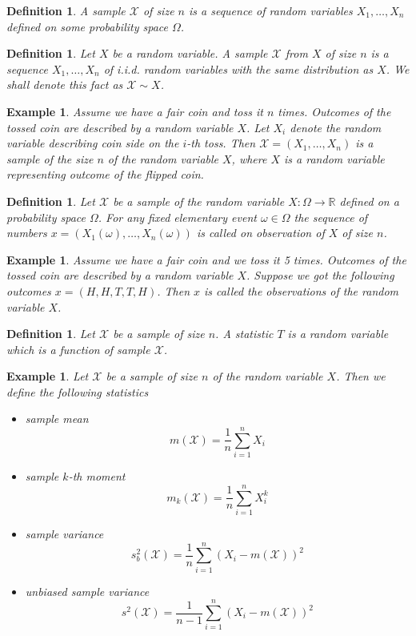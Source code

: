 \documentclass[12pt]{article}
\newtheorem{definition}[theorem]{Definition}
\newtheorem{example}[theorem]{Example}
\begin{document}
\begin{definition} A sample $\mathscr{X}$ of size $n$ is a sequence of random variables $X_1,\ldots,X_n$ defined on some probability space $\Omega$.
\end{definition}

\begin{definition} Let $X$ be a random variable. A sample $\mathscr{X}$ from $X$ of size $n$ is a sequence $X_1,\ldots,X_n$ of i.i.d. random variables with the same distribution as $X$. We shall denote this fact as $\mathscr{X}\sim X$. 
\end{definition}

\begin{example} Assume we have a fair coin and toss it $n$ times. Outcomes of the tossed coin are described by a random variable $X$. Let $X_i$ denote the random variable describing coin side on the $i$-th toss. Then $\mathscr{X}=(X_1,\ldots,X_n)$ is a sample of the size $n$ of the random variable $X$, where $X$ is a random variable representing outcome of the flipped coin.
\end{example}

\begin{definition} Let $\mathscr{X}$ be a sample of the random variable $X:\Omega\to\mathbb{R}$ defined on a probability space $\Omega$. For any fixed elementary event $\omega\in\Omega$ the sequence of numbers $x=(X_1(\omega),\ldots,X_n(\omega))$ is called on observation of $X$ of size $n$.
\end{definition}

\begin{example} Assume we have a fair coin and we toss it 5 times. Outcomes of the tossed coin are described by a random variable $X$. Suppose we got the following outcomes $x=(H,H,T,T,H)$. Then $x$ is called the observations of the random variable $X$.
\end{example}

\begin{definition} Let $\mathscr{X}$ be a sample of size $n$. A statistic $T$ is a random variable which is a function of sample $\mathscr{X}$.
\end{definition}

\begin{example} Let $\mathscr{X}$ be a sample of size $n$ of the random variable $X$. Then we define the following statistics
\begin{itemize}
    \item sample mean $$m(\mathscr{X})=\frac{1}{n}\sum_{i=1}^n X_i$$
    \item sample $k$-th moment $$m_{k}(\mathscr{X})=\frac{1}{n}\sum_{i=1}^n X_i^k$$
    \item sample variance $$s_b^2(\mathscr{X})=\frac{1}{n}\sum_{i=1}^n(X_i-m(\mathscr{X}))^2$$
    \item unbiased sample variance $$s^2(\mathscr{X})=\frac{1}{n-1}\sum_{i=1}^n(X_i-m(\mathscr{X}))^2$$
\end{itemize}
\end{example}
\end{document}
